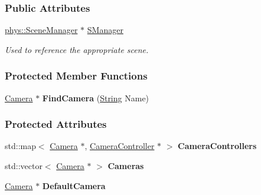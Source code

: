 \subsubsection*{Public Attributes}
\begin{DoxyCompactItemize}
\item 
\hypertarget{classphys_1_1CameraManager_a8e89645398c7d334e99280cfa721d864}{
\hyperlink{classphys_1_1SceneManager}{phys::SceneManager} $\ast$ \hyperlink{classphys_1_1CameraManager_a8e89645398c7d334e99280cfa721d864}{SManager}}
\label{classphys_1_1CameraManager_a8e89645398c7d334e99280cfa721d864}

\begin{DoxyCompactList}\small\item\em Used to reference the appropriate scene. \item\end{DoxyCompactList}\end{DoxyCompactItemize}
\subsubsection*{Protected Member Functions}
\begin{DoxyCompactItemize}
\item 
\hypertarget{classphys_1_1CameraManager_a17eb1f44fff4fe4af8683cedba0c9fbf}{
\hyperlink{classphys_1_1Camera}{Camera} $\ast$ {\bfseries FindCamera} (\hyperlink{namespacephys_aa03900411993de7fbfec4789bc1d392e}{String} Name)}
\label{classphys_1_1CameraManager_a17eb1f44fff4fe4af8683cedba0c9fbf}

\end{DoxyCompactItemize}
\subsubsection*{Protected Attributes}
\begin{DoxyCompactItemize}
\item 
\hypertarget{classphys_1_1CameraManager_a3c5efb4cdc85b5426c43119ef11ee39b}{
std::map$<$ \hyperlink{classphys_1_1Camera}{Camera} $\ast$, \hyperlink{classphys_1_1CameraController}{CameraController} $\ast$ $>$ {\bfseries CameraControllers}}
\label{classphys_1_1CameraManager_a3c5efb4cdc85b5426c43119ef11ee39b}

\item 
\hypertarget{classphys_1_1CameraManager_a49af26478b62e2246ca1abd19abeec6c}{
std::vector$<$ \hyperlink{classphys_1_1Camera}{Camera} $\ast$ $>$ {\bfseries Cameras}}
\label{classphys_1_1CameraManager_a49af26478b62e2246ca1abd19abeec6c}

\item 
\hypertarget{classphys_1_1CameraManager_a1f8aa3d003e6cfed9eee3527118518fb}{
\hyperlink{classphys_1_1Camera}{Camera} $\ast$ {\bfseries DefaultCamera}}
\label{classphys_1_1CameraManager_a1f8aa3d003e6cfed9eee3527118518fb}

\end{DoxyCompactItemize}
